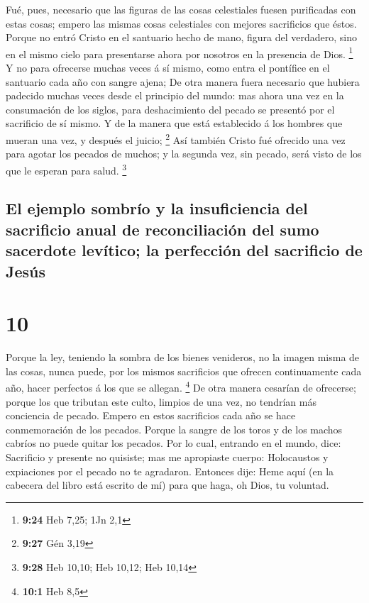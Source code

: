  Fué, pues, necesario que las figuras de las cosas
celestiales fuesen purificadas con estas cosas; empero las mismas cosas
celestiales con mejores sacrificios que éstos.  Porque no
entró Cristo en el santuario hecho de mano, figura del verdadero, sino
en el mismo cielo para presentarse ahora por nosotros en la presencia de
Dios. \footnote{\textbf{9:24} Heb 7,25; 1Jn 2,1}  Y no para
ofrecerse muchas veces á sí mismo, como entra el pontífice en el
santuario cada año con sangre ajena;  De otra manera fuera
necesario que hubiera padecido muchas veces desde el principio del
mundo: mas ahora una vez en la consumación de los siglos, para
deshacimiento del pecado se presentó por el sacrificio de sí mismo.
 Y de la manera que está establecido á los hombres que
mueran una vez, y después el juicio; \footnote{\textbf{9:27} Gén 3,19}
 Así también Cristo fué ofrecido una vez para agotar los
pecados de muchos; y la segunda vez, sin pecado, será visto de los que
le esperan para salud. \footnote{\textbf{9:28} Heb 10,10; Heb 10,12; Heb
  10,14}

\hypertarget{el-ejemplo-sombruxedo-y-la-insuficiencia-del-sacrificio-anual-de-reconciliaciuxf3n-del-sumo-sacerdote-levuxedtico-la-perfecciuxf3n-del-sacrificio-de-jesuxfas}{%
\subsection{El ejemplo sombrío y la insuficiencia del sacrificio anual
de reconciliación del sumo sacerdote levítico; la perfección del
sacrificio de
Jesús}\label{el-ejemplo-sombruxedo-y-la-insuficiencia-del-sacrificio-anual-de-reconciliaciuxf3n-del-sumo-sacerdote-levuxedtico-la-perfecciuxf3n-del-sacrificio-de-jesuxfas}}

\hypertarget{section-9}{%
\section{10}\label{section-9}}

 Porque la ley, teniendo la sombra de los bienes venideros,
no la imagen misma de las cosas, nunca puede, por los mismos sacrificios
que ofrecen continuamente cada año, hacer perfectos á los que se
allegan. \footnote{\textbf{10:1} Heb 8,5}  De otra manera
cesarían de ofrecerse; porque los que tributan este culto, limpios de
una vez, no tendrían más conciencia de pecado.  Empero en
estos sacrificios cada año se hace conmemoración de los pecados.
 Porque la sangre de los toros y de los machos cabríos no
puede quitar los pecados.  Por lo cual, entrando en el
mundo, dice: Sacrificio y presente no quisiste; mas me apropiaste
cuerpo:  Holocaustos y expiaciones por el pecado no te
agradaron.  Entonces dije: Heme aquí (en la cabecera del
libro está escrito de mí) para que haga, oh Dios, tu voluntad.

